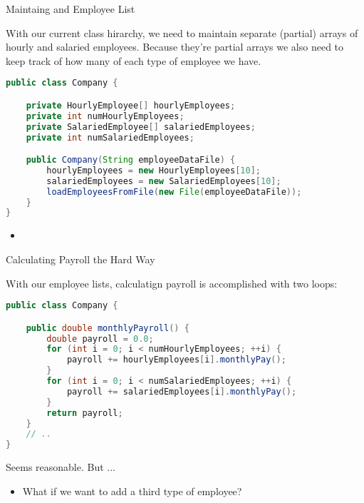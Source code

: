\documentclass{beamer}
\begin{document}
\begin{frame}[fragile]{Maintaing and Employee List}


With our current class hirarchy, we need to maintain separate (partial) arrays of hourly and salaried employees.  Because they're partial arrays we also need to keep track of how many of each type of employee we have.
\begin{lstlisting}[language=Java]
public class Company {

    private HourlyEmployee[] hourlyEmployees;
    private int numHourlyEmployees;
    private SalariedEmployee[] salariedEmployees;
    private int numSalariedEmployees;

    public Company(String employeeDataFile) {
        hourlyEmployees = new HourlyEmployees[10];
        salariedEmployees = new SalariedEmployees[10];
        loadEmployeesFromFile(new File(employeeDataFile));
    }
}
\end{lstlisting}

\begin{itemize}
\item
\end{itemize}


\end{frame}

\begin{frame}[fragile]{Calculating Payroll the Hard Way}


With our employee lists, calculatign payroll is accomplished with two loops:
\begin{lstlisting}[language=Java]
public class Company {

    public double monthlyPayroll() {
        double payroll = 0.0;
        for (int i = 0; i < numHourlyEmployees; ++i) {
            payroll += hourlyEmployees[i].monthlyPay();
        }
        for (int i = 0; i < numSalariedEmployees; ++i) {
            payroll += salariedEmployees[i].monthlyPay();
        }
        return payroll;
    }
    // ..
}
\end{lstlisting}
Seems reasonable.  But ...
\begin{itemize}
\item What if we want to add a third type of employee?
\end{itemize}


\end{frame}
\end{document}

